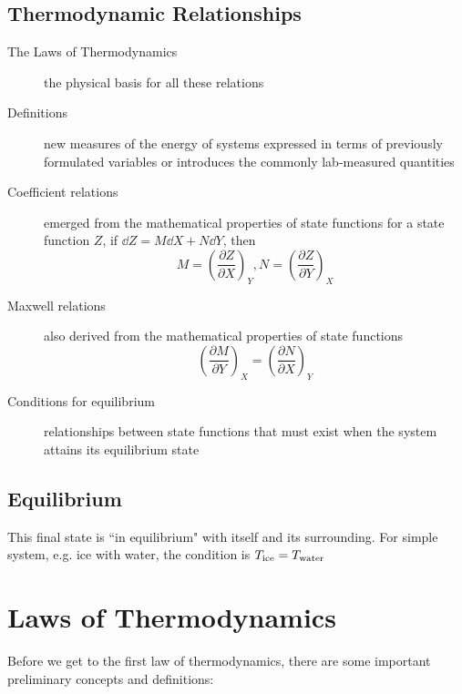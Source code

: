 \documentclass[UTF8]{book}
\newenvironment{theorem}[2][Theorem]{\begin{trivlist}
\item[\hskip \labelsep {\bfseries #1}\hskip \labelsep {\bfseries }]}{\end{trivlist}}
\begin{document}
\section{Thermodynamic Relationships}
\begin{description}
\item[The Laws of Thermodynamics] the physical basis for all these relations
\item[Definitions] new measures of the energy of systems expressed in
terms of previously formulated variables or introduces the commonly
lab‐measured quantities
\item[Coefficient relations] emerged from the mathematical properties of
state functions
for a state function $Z$, if $\dd{Z}=M\dd{X}+N\dd{Y}$, then
\[M=\left(\frac{\partial Z}{\partial X}\right)_Y,
N=\left(\frac{\partial Z}{\partial Y}\right)_X\]
\item[Maxwell relations] also derived from the mathematical properties of
state functions
\[\left(\frac{\partial M}{\partial Y}\right)_X=\left(\frac{\partial N}{\partial X}\right)_Y\]
\item[Conditions for equilibrium] relationships between state functions that
must exist when the system attains its equilibrium state
\end{description}

\section{Equilibrium}
This final state is ``in equilibrium" with
itself and its surrounding.  For simple system, e.g. ice with water,
the condition is $T _{\rm ice} = T _{\rm water}$

\chapter{Laws of Thermodynamics}

Before we get to the first law of thermodynamics, there are some important preliminary concepts and definitions:

\end{document}
